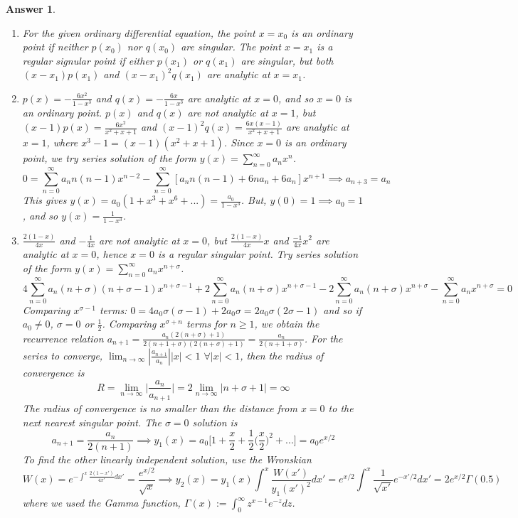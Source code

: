 \documentclass[a4paper]{article}
\newtheorem{ans}{Answer}[section]
\theoremstyle{new}
\begin{document}
\begin{ans}\leavevmode
\begin{enumerate}[label=(\alph*)]
\item For the given ordinary differential equation, the point $x=x_0$ is an ordinary point if neither $p(x_0)$ nor $q(x_0)$ are singular. The point $x=x_1$ is a regular signular point if either $p(x_1)$ or $q(x_1)$ are singular, but both $(x-x_1)p(x_1)$ and $(x-x_1)^2q(x_1)$ are analytic at $x=x_1$.
\item $p(x)=-\frac{6x^2}{1-x^3}$ and $q(x)=-\frac{6x}{1-x^3}$ are analytic at $x=0$, and so $x=0$ is an ordinary point. $p(x)$ and $q(x)$ are not analytic at $x=1$, but $(x-1)p(x)=\frac{6x^2}{x^2+x+1}$ and $(x-1)^2q(x)=\frac{6x(x-1)}{x^2+x+1}$ are analytic at $x=1$, where $x^3-1=(x-1)(x^2+x+1)$. Since $x=0$ is an ordinary point, we try series solution of the form $y(x)=\sum_{n=0}^\infty a_nx^n$.
$$0=\sum_{n=0}^\infty a_nn(n-1)x^{n-2}-\sum_{n=0}^\infty[a_nn(n-1)+6na_n+6a_n]x^{n+1}\implies a_{n+3}=a_n$$
This gives $y(x)=a_0(1+x^3+x^6+...)=\frac{a_0}{1-x^3}$. But, $y(0)=1\implies a_0=1$, and so $y(x)=\frac{1}{1-x^3}$.
\item $\frac{2(1-x)}{4x}$ and $-\frac{1}{4x}$ are not analytic at $x=0$, but $\frac{2(1-x)}{4x}x$ and $\frac{-1}{4x}x^2$ are analytic at $x=0$, hence $x=0$ is a regular singular point. Try series solution of the form $y(x)=\sum_{n=0}^\infty a_nx^{n+\sigma}$.
$$4\sum_{n=0}^\infty a_n(n+\sigma)(n+\sigma-1)x^{n+\sigma-1}+2\sum_{n=0}^\infty a_n(n+\sigma)x^{n+\sigma-1}-2\sum_{n=0}^\infty a_n(n+\sigma)x^{n+\sigma}-\sum_{n=0}^\infty a_nx^{n+\sigma}=0$$
Comparing $x^{\sigma-1}$ terms: $0=4a_0\sigma(\sigma-1)+2a_0\sigma=2a_0\sigma(2\sigma-1)$ and so if $a_0\neq0$, $\sigma=0$ or $\frac{1}{2}$. Comparing $x^{\sigma+n}$ terms for $n\geq1$, we obtain the recurrence relation $a_{n+1}=\frac{a_n(2(n+\sigma)+1)}{2(n+1+\sigma)(2(n+\sigma)+1)}=\frac{a_n}{2(n+1+\sigma)}$. For the series to converge, $\lim_{n\rightarrow\infty}|\frac{a_{n+1}}{a_n}||x|<1$ $\forall|x|<1$, then the radius of convergence is
$$R=\lim_{n\rightarrow\infty}\bigg|\frac{a_n}{a_{n+1}}\bigg|=2\lim_{n\rightarrow\infty}|n+\sigma+1|=\infty$$
The radius of convergence is no smaller than the distance from $x=0$ to the next nearest singular point. The $\sigma=0$ solution is
$$a_{n+1}=\frac{a_n}{2(n+1)}\implies y_1(x)=a_0\bigg[1+\frac{x}{2}+\frac{1}{2}\bigg(\frac{x}{2}\bigg)^2+...\bigg]=a_0e^{x/2}$$
To find the other linearly independent solution, use the Wronskian
$$W(x)=e^{-\int^x\frac{2(1-x')}{4x'}dx'}=\frac{e^{x/2}}{\sqrt{x}}\implies y_2(x)=y_1(x)\int^x\frac{W(x')}{y_1(x')^2}dx'=e^{x/2}\int^x\frac{1}{\sqrt{x'}}e^{-x'/2}dx'=2e^{x/2}\Gamma(0.5)$$
where we used the Gamma function, $\Gamma(x):=\int_0^\infty z^{x-1}e^{-z}dz$.
\end{enumerate}
\end{ans}
\end{document}
